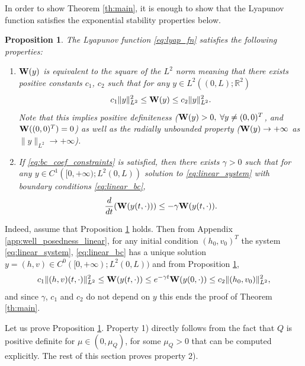\documentclass[11pt]{article}
\newtheorem{proposition}{Proposition}[section]
\begin{document}
{
In order to show Theorem \ref{th:main}, it is enough to show that the Lyapunov function satisfies the exponential stability properties below.

\begin{proposition}
    The Lyapunov function \eqref{eq:lyap_fn} satisfies the following properties:
    \begin{enumerate}
        \item ${\bf {W}}(y)$ 
        is equivalent to the square of the $L^{2}$ norm meaning that there exists positive constants $c_{1}$, $c_{2}$ such that for any $y\in L^{2}((0,L);\mathbb{R}^{2})$
        \[ c_1 \| y \|_{L^2}^{{2}} \leq {\bf {W}}(y) \leq c_2 \| y \|_{L^2}^{{2}}.\] Note that this implies positive definiteness (${\bf {W}}(y) > 0, \; \forall y \neq (0, 0)^T$, and ${\bf {W}}((0, 0)^T) = 0$) as well as the radially unbounded property (${\bf {W}}(y) \to +\infty$ as $\| y \|_{L^2} \to +\infty$).
        \item If \eqref{eq:bc_coef_constraints} is satisfied, then there exists $\gamma>0$ such that for any 
        $y\in C^{1}([0,{+\infty)};L^{2}(0,L))$ solution to \eqref{eq:linear_system} with boundary conditions \eqref{eq:linear_bc}, \[\frac{d}{dt}({\bf {W}}(y(t,\cdot))) \leq - \gamma {\bf {W}}(y(t,\cdot)).\]
    \end{enumerate}
    \label{prop:lyap_3_props}
\end{proposition}
{Indeed, assume that Proposition \ref{prop:lyap_3_props} holds. Then from Appendix \ref{app:well_posedness_linear}, for any initial condition $(h_{0},v_{0})^{T}$ the system \eqref{eq:linear_system}, \eqref{eq:linear_bc} has a unique solution $y=(h,v)\in C^{0}([0,+\infty);L^{2}(0,L))$ and from Proposition \ref{prop:lyap_3_props},
\begin{equation}
    c_{1}\|(h,v)(t,\cdot)\|_{L^{2}}^{2}\leq {\bf {W}}(y(t,\cdot)) \leq e^{-\gamma t}{\bf {W}}(y(0,\cdot))\leq c_{2} \|(h_{0},v_{0})\|_{L^{2}}^{2},
\end{equation}
and since $\gamma$, $c_{1}$ and $c_{2}$ do not depend on $y$ this ends the proof of Theorem \ref{th:main}.
}

{Let us prove Proposition \ref{prop:lyap_3_props}.} Property 1) directly follows from the fact that $Q$ is positive definite for $\mu \in (0, \mu_Q)$, for some $\mu_Q > 0$ that can be computed explicitly. The rest of this section proves property 2).
}
\end{document}
